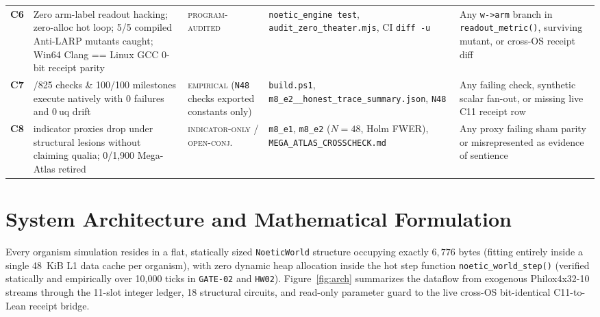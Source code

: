 \documentclass[11pt,reqno]{amsart}
\theoremstyle{remark}
\newcommand{\tagPA}{\textsc{program-audited}}
\newcommand{\tagEM}{\textsc{empirical}}
\newcommand{\tagIO}{\textsc{indicator-only}}
\newcommand{\tagOC}{\textsc{open-conj.}}
\begin{document}
\begin{table}[ht]
\begin{tabular}{@{} c >{\raggedright\arraybackslash}p{4.3cm} >{\raggedright\arraybackslash}p{2.2cm} >{\raggedright\arraybackslash}p{3.1cm} >{\raggedright\arraybackslash}p{3.6cm} @{}}
\textbf{C6} & Zero arm-label readout hacking; zero-alloc hot loop; 5/5 compiled Anti-LARP mutants caught; Win64 Clang == Linux GCC 0-bit receipt parity & \tagPA{} & \texttt{noetic\_engine test}, \texttt{audit\_\allowbreak zero\_\allowbreak theater.mjs}, CI \texttt{diff -u} & Any \texttt{w->arm} branch in \texttt{readout\_\allowbreak metric()}, surviving mutant, or cross-OS receipt diff \\
\textbf{C7} & 825/825 checks \& 100/100 milestones execute natively with 0 failures and $0~\text{uq}$ drift & \tagEM{} (\texttt{N48} checks exported constants only) & \texttt{build.ps1}, \texttt{m8\_e2\_\allowbreak 825\_\allowbreak honest\_\allowbreak trace\_\allowbreak summary.json}, \texttt{N48} & Any failing check, synthetic scalar fan-out, or missing live C11 receipt row \\
\textbf{C8} & 29 indicator proxies drop under structural lesions without claiming qualia; 0/1,900 Mega-Atlas retired & \tagIO{} / \tagOC{} & \texttt{m8\_e1}, \texttt{m8\_e2} ($N=48$, Holm FWER), \texttt{MEGA\_\allowbreak ATLAS\_\allowbreak CROSSCHECK.md} & Any proxy failing sham parity or misrepresented as evidence of sentience \\
\bottomrule
\end{tabular}
\end{table}

\section{System Architecture and Mathematical Formulation}
\label{sec:arch}

Every organism simulation resides in a flat, statically sized \texttt{NoeticWorld} structure occupying exactly $6{,}776$ bytes (fitting entirely inside a single 48~KiB L1 data cache per organism), with zero dynamic heap allocation inside the hot step function \texttt{noetic\_world\_step()} (verified statically and empirically over 10,000 ticks in \texttt{GATE-02} and \texttt{HW02}). Figure~\ref{fig:arch} summarizes the dataflow from exogenous Philox4x32-10 streams through the 11-slot integer ledger, 18 structural circuits, and read-only parameter guard to the live cross-OS bit-identical C11-to-Lean receipt bridge.
\end{document}

